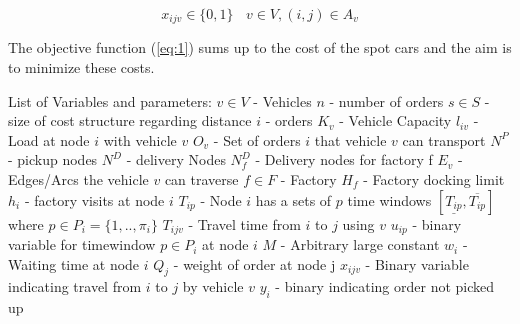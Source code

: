\documentclass[a4paper,12pt]{article}
\begin{document}
\begin{equation} \label{eq:22}
x_{ijv} \in \{0, 1\} ~~~~ v \in V, (i, j) \in A_v
\end{equation}




\par
The objective function (\ref{eq:1}) sums up to the cost of the spot cars and the aim is to minimize these costs. \newline \newline


List of Variables and parameters: \newline
$v \in V$ - Vehicles \newline
$n$ - number of orders\newline
$s \in S$ - size of cost structure regarding distance \newline
$i$ - orders\newline
$K_v$ - Vehicle Capacity \newline
$l_{iv}$ - Load at node $i$ with vehicle $v$ \newline
$O_v$ - Set of orders $i$ that vehicle $v$ can transport \newline
$N^P$ - pickup nodes\newline
$N^D$ - delivery Nodes\newline
$N^D_f$ - Delivery nodes for factory f \newline
$E_v$ - Edges/Arcs the vehicle $v$ can traverse\newline
$f \in F$ - Factory\newline
$H_f$ - Factory docking limit\newline
$h_{i}$ - factory visits at node $i$  \newline
$T_{ip}$ - Node $i$ has a sets of $p$ time windows $[ \underline{T_{ip}},  \overline{T_{ip}} ]$ where $p \in P_i =\{1,..,\pi_i \}$ \newline
$T_{ijv}$ - Travel time from $i$ to $j$ using $v$\newline
$u_{ip}$ - binary variable for timewindow $p\in P_i$ at node $i$\newline
$M$ - Arbitrary large constant \newline
$w_i$ - Waiting time at node $i$ \newline
$Q_j$ - weight of order at node j \newline
$x_{ijv}$ - Binary variable indicating travel from $i$ to $j$ by vehicle $v$ \newline
$y_i$ - binary indicating order not picked up \newline
\end{document}
